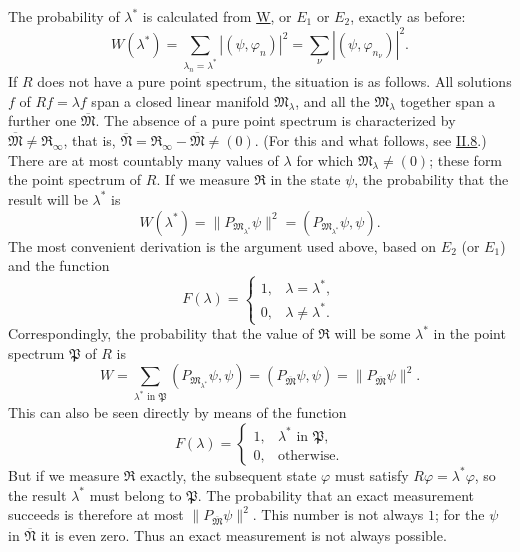 \documentclass[fontsize=13pt,twoside,openany,headings=normal,parskip=false,bookmarkpackage=false,DIV=calc]{scrbook}
\begin{document}
The probability of $\lambda^*$ is calculated from \hyperref[post:III.1.W]{W}, or \hyperref[post:III.1.E1]{$E_1$} or \hyperref[post:III.1.E2]{$E_2$}, exactly as before:
\[
W(\lambda^*)=\sum_{\lambda_n=\lambda^*}|(\psi,\varphi_n)|^2
=\sum_\nu|(\psi,\varphi_{n_\nu})|^2.
\]
If $R$ does not have a pure point spectrum, the situation is as follows. All solutions $f$ of $Rf=\lambda f$ span a closed linear manifold $\mathfrak M_\lambda$, and all the $\mathfrak M_\lambda$ together span a further one $\overline{\mathfrak M}$. The absence of a pure point spectrum is characterized by $\overline{\mathfrak M}\ne\mathfrak R_\infty$, that is, $\overline{\mathfrak N}=\mathfrak R_\infty-\overline{\mathfrak M}\ne(0)$. (For this and what follows, see \hyperref[sec:II.8]{II.8}.) There are at most countably many values of $\lambda$ for which $\mathfrak M_\lambda\ne(0)$; these
\hypertarget{origpage-115}{}%
form the point spectrum of $R$. If we measure $\mathfrak R$ in the state $\psi$, the probability that the result will be $\lambda^*$ is
\[
W(\lambda^*)=\|P_{\mathfrak M_{\lambda^*}}\psi\|^2
=(P_{\mathfrak M_{\lambda^*}}\psi,\psi).
\]
The most convenient derivation is the argument used above, based on \hyperref[post:III.1.E2]{$E_2$} (or \hyperref[post:III.1.E1]{$E_1$}) and the function
\[
F(\lambda)=\begin{cases}1,&\lambda=\lambda^*,\\0,&\lambda\ne\lambda^*.\end{cases}
\]
Correspondingly, the probability that the value of $\mathfrak R$ will be some $\lambda^*$ in the point spectrum $\mathfrak P$ of $R$ is
\[
W=\sum_{\lambda^*\text{ in }\mathfrak P}(P_{\mathfrak M_{\lambda^*}}\psi,\psi)
=(P_{\overline{\mathfrak M}}\psi,\psi)=\|P_{\overline{\mathfrak M}}\psi\|^2.
\]
This can also be seen directly by means of the function
\[
F(\lambda)=\begin{cases}1,&\lambda^*\text{ in }\mathfrak P,\\0,&\text{otherwise}.\end{cases}
\]
But if we measure $\mathfrak R$ exactly, the subsequent state $\varphi$ must satisfy $R\varphi=\lambda^*\varphi$, so the result $\lambda^*$ must belong to $\mathfrak P$. The probability that an exact measurement succeeds is therefore at most $\|P_{\overline{\mathfrak M}}\psi\|^2$. This number is not always $1$; for the $\psi$ in $\overline{\mathfrak N}$ it is even zero. Thus an exact measurement is not always possible.
\end{document}
